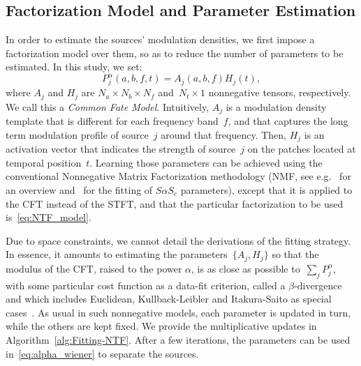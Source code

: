 \subsection{Factorization Model and Parameter Estimation}

\label{sub:NTF}

In order to estimate the sources' modulation densities, we first impose
a factorization model over them, so as to reduce the number of parameters
to be estimated. In this study, we set:
\begin{equation}
P_{j}^{\alpha}\left(a,b,f,t\right)=A_{j}\left(a,b,f\right)H_{j}\left(t\right),\label{eq:NTF_model}
\end{equation}
where $A_{j}$ and $H_{j}$ are $N_{a}\times N_{b}\times N_{f}$ and~$N_{t}\times1$
nonnegative tensors, respectively. We call this a \emph{Common Fate
Model}. Intuitively, $A_{j}$ is a modulation density template that
is different for each frequency band~$f$, and that captures the
long term modulation profile of source~$j$ around that frequency.
Then, $H_{j}$ is an activation vector that indicates the strength
of source~$j$ on the patches located at temporal position~$t$.
Learning those parameters can be achieved using the conventional Nonnegative
Matrix Factorization methodology (NMF, see e.g.~\cite{cichoki09,ozerov12,smaragdis14}
for an overview and~\cite{liutkus15b} for the fitting of $S\alpha S_{c}$
parameters), except that it is applied to the CFT instead of the STFT,
and that the particular factorization to be used is~\eqref{eq:NTF_model}.

Due to space constraints, we cannot detail the derivations of the
fitting strategy. In essence, it amounts to estimating the parameters~$\{ A_{j},H_{j}\} $
so that the modulus of the CFT, raised to the power $\alpha$, is
as close as possible to~$\sum_{j}P_{j}^{\alpha}$, with some particular
cost function as a data-fit criterion, called a $\beta$-divergence
and which includes Euclidean, Kullback-Leibler and Itakura-Saito as
special cases~\cite{fitzgerald08a}. As usual in such nonnegative models,
each parameter is updated in turn, while the others are kept fixed.
We provide the multiplicative updates in Algorithm~\ref{alg:Fitting-NTF}.
After a few iterations, the parameters can be used in~\eqref{eq:alpha_wiener} to separate
the sources.

